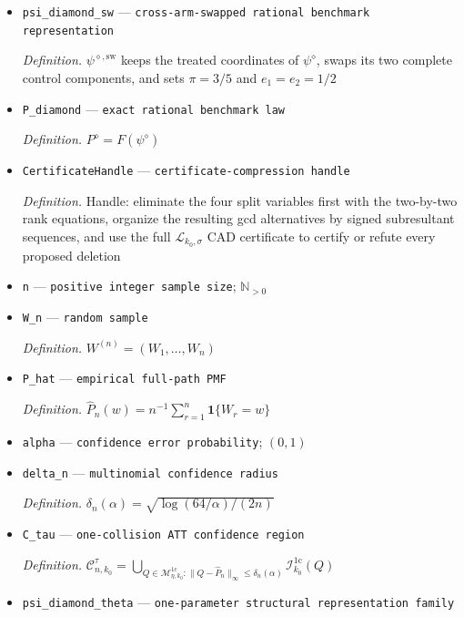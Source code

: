 \documentclass{article}
\begin{document}
\begin{itemize}
  \item \texttt{psi\_\allowbreak{}diamond\_\allowbreak{}sw} --- \texttt{cross-\allowbreak{}arm-\allowbreak{}swapped rational benchmark representation}
  \par\smallskip\noindent\emph{Definition.} \(\psi^{\diamond,\mathrm{sw}}\) keeps the treated coordinates of \(\psi^{\diamond}\), swaps its two complete control components, and sets \(\pi=3/5\) and \(e_1=e_2=1/2\)
  \item \texttt{P\_\allowbreak{}diamond} --- \texttt{exact rational benchmark law}
  \par\smallskip\noindent\emph{Definition.} \(P^{\diamond}=F(\psi^{\diamond})\)
  \item \texttt{CertificateHandle} --- \texttt{certificate-\allowbreak{}compression handle}
  \par\smallskip\noindent\emph{Definition.} Handle: eliminate the four split variables first with the two-by-two rank equations, organize the resulting gcd alternatives by signed subresultant sequences, and use the full \(\mathscr L_{k_0,\sigma}\) CAD certificate to certify or refute every proposed deletion
  \item \texttt{n} --- \texttt{positive integer sample size}; \(\mathbb N_{>0}\)
  \item \texttt{W\_\allowbreak{}n} --- \texttt{random sample}
  \par\smallskip\noindent\emph{Definition.} \(W^{(n)}=(W_1,\ldots,W_n)\)
  \item \texttt{P\_\allowbreak{}hat} --- \texttt{empirical full-\allowbreak{}path PMF}
  \par\smallskip\noindent\emph{Definition.} \(\widehat P_n(w)=n^{-1}\sum_{r=1}^{n}\mathbf 1\{W_r=w\}\)
  \item \texttt{alpha} --- \texttt{confidence error probability}; \((0,1)\)
  \item \texttt{delta\_\allowbreak{}n} --- \texttt{multinomial confidence radius}
  \par\smallskip\noindent\emph{Definition.} \(\delta_n(\alpha)=\sqrt{\log(64/\alpha)/(2n)}\)
  \item \texttt{C\_\allowbreak{}tau} --- \texttt{one-\allowbreak{}collision ATT confidence region}
  \par\smallskip\noindent\emph{Definition.} \(\mathcal C_{n,k_0}^{\tau}=\bigcup_{Q\in\mathcal M_{\eta,k_0}^{1\mathrm c}:\lVert Q-\widehat P_n\rVert_\infty\le\delta_n(\alpha)}\mathcal I_{k_0}^{1\mathrm c}(Q)\)
  \item \texttt{psi\_\allowbreak{}diamond\_\allowbreak{}theta} --- \texttt{one-\allowbreak{}parameter structural representation family}

\end{itemize}
\end{document}
